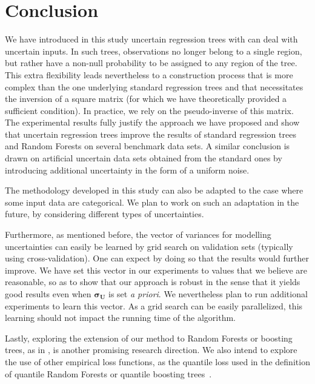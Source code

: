 \section{Conclusion}
\label{sec:concl}

We have introduced in this study uncertain regression trees with can deal with uncertain inputs. In such trees, observations no longer belong to a single region, but rather have a non-null probability to be assigned to any region of the tree. This extra flexibility leads nevertheless to a construction process that is more complex than the one underlying standard regression trees and that necessitates the inversion of a square matrix (for which we have theoretically provided a sufficient condition). In practice, we rely on the pseudo-inverse of this matrix. The experimental results fully justify the approach we have proposed and show that uncertain regression trees improve the results of standard regression trees and Random Forests on several benchmark data sets. A similar conclusion is drawn on artificial uncertain data sets obtained from the standard ones by introducing additional uncertainty in the form of a uniform noise.

The methodology developed in this study can also be adapted to the case where some input data are categorical. We plan to work on such an adaptation in the future, by considering different types of uncertainties.

Furthermore, as mentioned before, the vector of variances for modelling uncertainties can easily be learned by grid search on validation sets (typically using cross-validation). One can expect by doing so that the results would further improve. We have set this vector in our experiments to values that we believe are reasonable, so as to show that our approach is robust in the sense that it yields good results even when $\boldsymbol{\sigma_U}$ is set \textit{a priori}. We nevertheless plan to run additional experiments to learn this vector. As a grid search can be easily parallelized, this learning should not impact the running time of the algorithm.

Lastly, exploring the extension of our method to Random Forests or boosting trees, as in \cite{freund1999short,Ridgeway2007}, is another promising research direction. We also intend to explore the use of other empirical loss functions, as the quantile loss used in the definition of quantile Random Forests or quantile boosting trees~\cite{fenske2011identifying, kriegler2007boosting, kriegler2010small,meinshausen2006quantile}.
